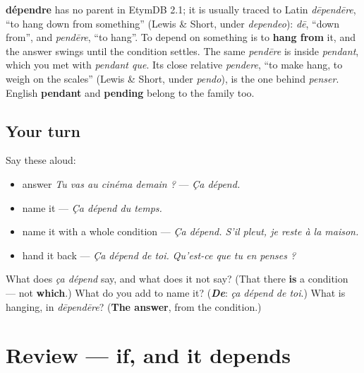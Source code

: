 \begin{cousinweb}
\textbf{dépendre} has no parent in EtymDB 2.1; it is usually traced to Latin \emph{dēpendēre}, \textquotedblleft{}to hang down from something\textquotedblright{} (Lewis \& Short, under \emph{dependeo}): \emph{dē}, \textquotedblleft{}down from\textquotedblright{}, and \emph{pendēre}, \textquotedblleft{}to hang\textquotedblright{}. To depend on something is to \textbf{hang from} it, and the answer swings until the condition settles. The same \emph{pendēre} is inside \emph{pendant}, which you met with \emph{pendant que}. Its close relative \emph{pendere}, \textquotedblleft{}to make hang, to weigh on the scales\textquotedblright{} (Lewis \& Short, under \emph{pendo}), is the one behind \emph{penser}. English \textbf{pendant} and \textbf{pending} belong to the family too.
\end{cousinweb}

\subsection*{Your turn}
Say these aloud:

\begin{itemize}
\raggedright
  \item answer \emph{Tu vas au cinéma demain ?} — \emph{Ça dépend.}
  \item name it — \emph{Ça dépend du temps.}
  \item name it with a whole condition — \emph{Ça dépend. S'il pleut, je reste à la maison.}
  \item hand it back — \emph{Ça dépend de toi. Qu'est-ce que tu en penses ?}
\end{itemize}

\begin{tcolorbox}[breakable,colback=teal!4,colframe=teal!35!black,title={Before you move on}]
What does \emph{ça dépend} say, and what does it not say? (That there \textbf{is} a condition — not \textbf{which}.) What do you add to name it? (\emph{\textbf{De}}: \emph{ça dépend de toi}.) What is hanging, in \emph{dēpendēre}? (\textbf{The answer}, from the condition.)
\end{tcolorbox}
\section[(review)]{Review — if, and it depends}

\label{lesson:FR-C266-revision-conditions}




